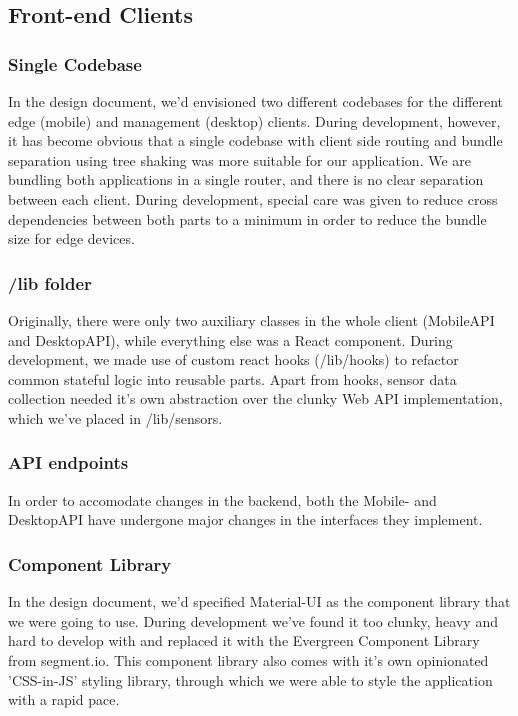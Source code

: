 \subsection{Front-end Clients}
\subsubsection{Single Codebase}
In the design document, we'd envisioned two different codebases for the different edge (mobile) and management (desktop) clients. During development, however, it has become obvious that a single codebase with client side routing and bundle separation using tree shaking was more suitable for our application. We are bundling both applications in a single router, and there is no clear separation between each client. During development, special care was given to reduce cross dependencies between both parts to a minimum in order to reduce the bundle size for edge devices.

\subsubsection{/lib folder}
Originally, there were only two auxiliary classes in the whole client (MobileAPI and DesktopAPI), while everything else was a React component. During development, we made use of custom react hooks (/lib/hooks) to refactor common stateful logic into reusable parts. Apart from hooks, sensor data collection needed it's own abstraction over the clunky Web API implementation, which we've placed in /lib/sensors.

\subsubsection{API endpoints}
In order to accomodate changes in the backend, both the Mobile- and DesktopAPI have undergone major changes in the interfaces they implement.

\subsubsection{Component Library}
In the design document, we'd specified Material-UI as the component library that we were going to use. During development we've found it too clunky, heavy and hard to develop with and replaced it with the Evergreen Component Library from segment.io. This component library also comes with it's own opinionated 'CSS-in-JS' styling library, through which we were able to style the application with a rapid pace.

